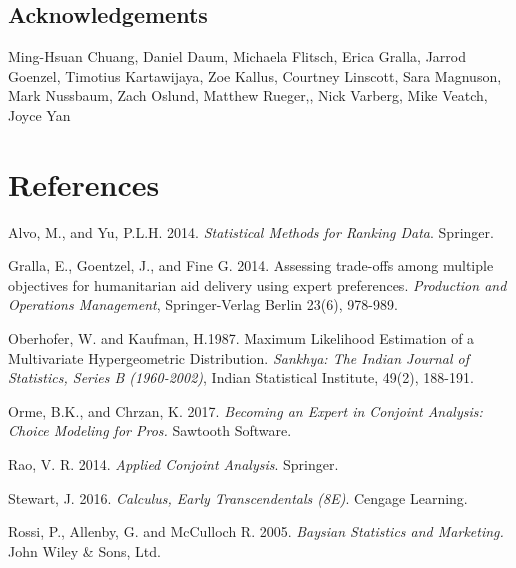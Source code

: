 \documentclass[a4paper, 12pt]{article}
\begin{document}
\subsection*{Acknowledgements}

Ming-Hsuan Chuang,
Daniel Daum, Michaela Flitsch, Erica Gralla, Jarrod Goenzel, Timotius Kartawijaya, Zoe Kallus, Courtney Linscott, Sara Magnuson, Mark Nussbaum, Zach Oslund, Matthew Rueger,, Nick Varberg, Mike Veatch, Joyce Yan   

\section*{References}
\begin{list}{}{\itemindent=-2em}
\small
\item Alvo, M., and Yu, P.L.H. 2014. \emph{Statistical Methods for Ranking Data}. Springer.

\item Gralla, E., Goentzel, J., and Fine G. 2014. Assessing trade-offs among multiple objectives for humanitarian aid delivery using expert preferences.
\emph{Production and Operations Management}, Springer-Verlag Berlin 23(6), 978-989.

\item Oberhofer, W. and Kaufman, H.1987.  Maximum Likelihood Estimation of a Multivariate Hypergeometric Distribution. \emph{Sankhya: The Indian Journal of Statistics, Series B (1960-2002)}, Indian Statistical Institute, 49(2), 188-191. 

\item Orme, B.K., and Chrzan, K. 2017. \emph{Becoming an Expert in Conjoint Analysis: Choice Modeling for Pros.} Sawtooth Software.

\item Rao, V. R. 2014. \emph{Applied Conjoint Analysis}. Springer.

\item  Stewart, J. 2016.  \emph{Calculus, Early Transcendentals (8E)}. Cengage Learning.

\item Rossi, P., Allenby, G. and McCulloch R. 2005. \emph{Baysian Statistics and Marketing.} John Wiley \& Sons, Ltd.


\end{list}
\end{document}
